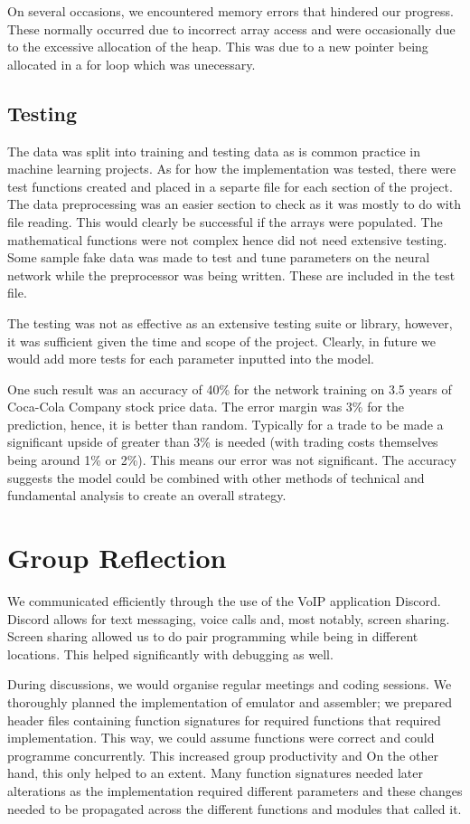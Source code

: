 \documentclass[11pt]{article}
\begin{document}
On several occasions, we encountered memory errors that hindered our progress. These normally occurred due to incorrect array access and were occasionally due to the excessive allocation of the heap. This was due to a new pointer being allocated in a for loop which was unecessary. 

\subsection{Testing}
The data was split into training and testing data as is common practice in machine learning projects. As for how the implementation was tested, there were test functions created and placed in a separte file for each section of the project. The data preprocessing was an easier section to check as it was mostly to do with file reading. This would clearly be successful if the arrays were populated. The mathematical functions were not complex hence did not need extensive testing. Some sample fake data was made to test and tune parameters on the neural network while the preprocessor was being written. These are included in the test file. 

The testing was not as effective as an extensive testing suite or library, however, it was sufficient given the time and scope of the project. Clearly, in future we would add more tests for each parameter inputted into the model.

One such result was an accuracy of 40\% for the network training on 3.5 years of Coca-Cola Company stock price data. The error margin was 3\% for the prediction, hence, it is better than random. Typically for a trade to be made a significant upside of greater than 3\% is needed (with trading costs themselves being around 1\% or 2\%). This means our error was not significant. The accuracy suggests the model could be combined with other methods of technical and fundamental analysis to create an overall strategy. 

\section{Group Reflection}
We communicated efficiently through the use of the VoIP application Discord. 
Discord allows for text messaging, voice calls and, most notably, screen sharing.
Screen sharing allowed us to do pair programming while being in different locations. This helped significantly with debugging as well. 

During discussions, we would organise regular meetings and coding sessions. We thoroughly planned the implementation of emulator and assembler; we prepared header files containing function signatures
for required functions that 
 required implementation. This way, we could assume functions were correct and could programme concurrently.
This increased group productivity and 
On the other hand, this only helped to an extent. Many function signatures needed later alterations 
as the implementation required different parameters and these changes needed to be propagated 
across the different functions and modules that called it.
\end{document}
